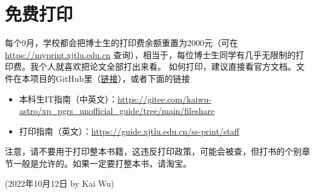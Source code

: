 \section{免费打印}
每个9月，学校都会把博士生的打印费余额重置为2000元（可在 \url{https://myprint.xjtlu.edu.cn} 查询），相当于，每位博士生同学有几乎无限制的打印费。我个人就喜欢把论文全部打出来看。
如何打印，建议直接看官方文档。文件在本项目的GitHub里（\href{https://github.com/kaiwu-astro/xp_pgrs_unofficial_guide/tree/main/fileshare}{链接}），或者下面的链接
\begin{itemize}
    \item 本科生IT指南（中英文）：\url{https://gitee.com/kaiwu-astro/xp_pgrs_unofficial_guide/tree/main/fileshare}
    \item 打印指南（英文）：\url{https://guide.xjtlu.edu.cn/ss-print/staff}
\end{itemize}

注意，请不要用于打印整本书籍，这违反打印政策，可能会被查，但打书的个别章节一般是允许的。如果一定要打整本书，请淘宝。


\begin{flushright}
(2022年10月12日 by Kai Wu)
\end{flushright}